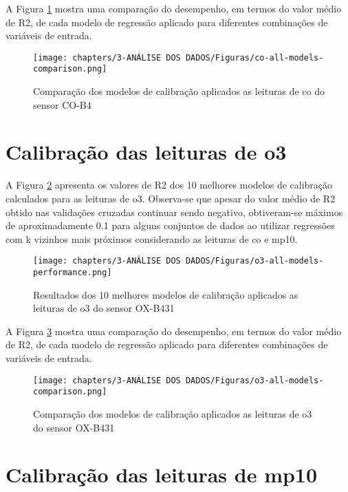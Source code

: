A Figura \ref{fig:data-co-all-models-comparison} mostra uma comparação do desempenho, em termos do valor médio de R2, de cada modelo de regressão aplicado para diferentes combinações de variáveis de entrada.

\begin{figure}[h]
    \centering
    \caption{Comparação dos modelos de calibração aplicados as leituras de \acrshort{co} do sensor CO-B4}
    \texttt{[image: chapters/3-ANÁLISE DOS DADOS/Figuras/co-all-models-comparison.png]}
    \label{fig:data-co-all-models-comparison}
\end{figure}

\section{Calibração das leituras de \acrshort{o3}}

A Figura \ref{fig:data-o3-all-models-performance} apresenta os valores de R2 dos 10 melhores modelos de calibração calculados para as leituras de \acrshort{o3}. Observa-se que apesar do valor médio de R2 obtido nas validações cruzadas continuar sendo negativo, obtiveram-se máximos de aproximadamente 0.1 para alguns conjuntos de dados ao utilizar regressões com k vizinhos mais próximos considerando as leituras de \acrshort{co} e \acrshort{mp10}.

\begin{figure}[h]
    \centering
    \caption{Resultados dos 10 melhores modelos de calibração aplicados as leituras de \acrshort{o3} do sensor OX-B431}
    \texttt{[image: chapters/3-ANÁLISE DOS DADOS/Figuras/o3-all-models-performance.png]}
    \label{fig:data-o3-all-models-performance}
\end{figure}

A Figura \ref{fig:data-o3-all-models-comparison} mostra uma comparação do desempenho, em termos do valor médio de R2, de cada modelo de regressão aplicado para diferentes combinações de variáveis de entrada.

\begin{figure}[h]
    \centering
    \caption{Comparação dos modelos de calibração aplicados as leituras de \acrshort{o3} do sensor OX-B431}
    \texttt{[image: chapters/3-ANÁLISE DOS DADOS/Figuras/o3-all-models-comparison.png]}
    \label{fig:data-o3-all-models-comparison}
\end{figure}

\section{Calibração das leituras de \acrshort{mp10}}

